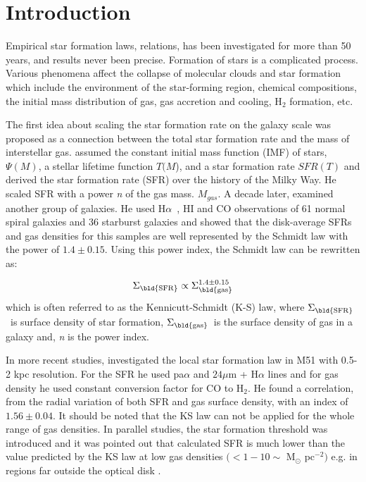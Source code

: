 \documentclass[useAMS,usenatbib]{mn2e}
\newcommand \sigmagas    {$\Sigma_{\rm \bld {gas }}$\ }
\newcommand \eqsigmagas    {\Sigma_{\rm \bld {gas }}}
\newcommand \sigmasfr     {$\Sigma_{\rm \bld {SFR }}$\ }
\newcommand \eqsigmasfr     {\Sigma_{\rm \bld {SFR }}}
\newcommand \halpha    {H$\alpha $\ }
\begin{document}
\section{Introduction}
\label{sec:intro} %

Empirical star formation laws, relations, has been investigated for more than 50 years, and results never been precise. Formation of stars is a complicated process. Various phenomena affect the collapse of molecular clouds and star formation which include the environment of the star-forming region, chemical compositions, the initial mass distribution of gas, gas accretion and cooling, H$_2$ formation, etc.

The first idea about scaling the star formation rate on the galaxy scale was proposed as a connection between the total star formation rate and the mass of interstellar gas. \cite{Schmidt59} assumed the constant initial mass function (IMF) of stars, $\Psi (M)$, a stellar lifetime function {$T(M$)}, and a star formation rate {$SFR(T)$} and derived the star formation rate (SFR) over the history of the Milky Way. He scaled SFR with a power {\it n} of the gas mass. $M_{gas}$. %
A decade later, \cite{Kennicutt98a} examined another group of galaxies. He used \halpha, HI and CO observations of 61 normal spiral galaxies and 36 starburst galaxies and showed that the disk-average SFRs and gas densities for this samples are well represented by the Schmidt law with the power of $1.4 \pm 0.15$. Using this power index, the Schmidt law can be rewritten as:

\begin{equation}
\eqsigmasfr \propto \eqsigmagas^{1.4\pm0.15}
\end{equation}
which is often referred to as the Kennicutt-Schmidt (K-S) law, where \sigmasfr is surface density of star formation, \sigmagas is the surface density of gas in a galaxy and, {\it n} is the power index.


In more recent studies, \cite{Kennicutt08} investigated the local star formation law in M51 with 0.5-2 kpc resolution. For the SFR he used pa${\alpha}$ and $24\mu$m + H${\alpha}$ lines and for gas density he used constant conversion factor for CO to H$_2$. He found a correlation, from the radial variation of both SFR and gas surface density, with an index of $1.56 \pm 0.04$.
It should be noted that the KS law can not be applied for the whole range of gas densities. In parallel studies, the star formation threshold was introduced and it was pointed out that calculated SFR is much lower than the value predicted by the KS law at low gas densities $( < 1-10\sim$ M$_{\odot}$ pc$^{-2})$ e.g. in regions far outside the optical disk \citep[e.g.,][]{Martin01, Bigiel08}.
\end{document}

